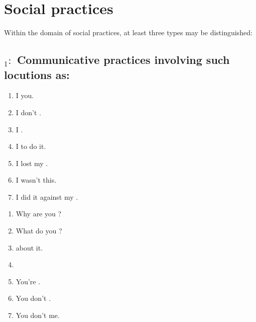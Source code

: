 \documentclass[12pt]{article}
\begin{document}
\section{Social practices}
Within the domain of social practices, at least three types may be distinguished:
\subsection*{$_1:$ Communicative practices involving such locutions as:}
\parbox[c]{.33\linewidth}{\small\raggedright
\begin{enumerate}{\hspace*{.5ex}}\itemsep=.2ex
\item I  you.
\item I don't .
\item I  .
\item I  to do it.
\item I lost my .
\item I wasn't  this.
\item I did it against my .
\end{enumerate}}\hspace{.5ex}
\parbox[c]{.33\linewidth}{\small\raggedright
\begin{enumerate}{\hspace*{.5ex}}\itemsep=.2ex
\item Why are you ?
\item What do you ?
\item {} about it.
\item {}
\item You're .
\item You don't .
\item You don't  me.
\end{enumerate}}\hspace{.5ex}
\end{document}
